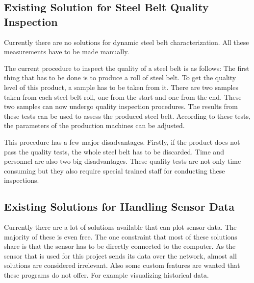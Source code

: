 

\subsection{Existing Solution for Steel Belt Quality Inspection}

Currently there are no solutions for dynamic steel belt characterization. All these measurements have to be made manually.

The current procedure to inspect the quality of a steel belt is as follows: The first thing that has to be done is to produce a roll of steel belt. To get the quality level of this product, a sample has to be taken from it. There are two samples taken from each steel belt roll, one from the start and one from the end. These two samples can now undergo quality inspection procedures. The results from these tests can be used to assess the produced steel belt. According to these tests, the parameters of the production machines can be adjusted.

This procedure has a few major disadvantages. Firstly, if the product does not pass the quality tests, the whole steel belt has to be discarded. Time and personnel are also two big disadvantages. These quality tests are not only time consuming but they also require special trained staff for conducting these inspections.

\subsection{Existing Solutions for Handling Sensor Data}

Currently there are a lot of solutions available that can plot sensor data. The majority of these is even free. The one constraint that most of these solutions share is that the sensor has to be directly connected to the computer. As the sensor that is used for this project sends its data over the network, almost all solutions are considered irrelevant. Also some custom features are wanted that these programs do not offer. For example visualizing historical data.

